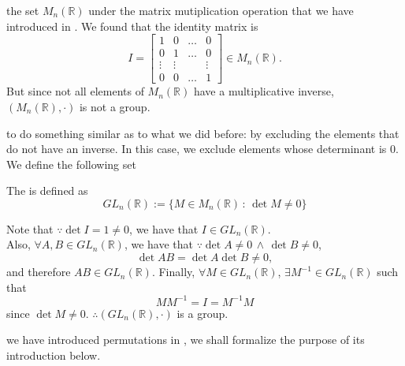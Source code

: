  the set $M_n(\mathbb{R})$ under the matrix mutiplication operation that we have introduced in . We found that the identity matrix is
\begin{equation*}
  I = \begin{bmatrix}
    1 & 0 & \hdots & 0 \\
    0 & 1 & \hdots & 0 \\
    \vdots & \vdots & & \vdots \\
    0 & 0 & \hdots & 1
  \end{bmatrix} \in M_n(\mathbb{R}).
\end{equation*}
But since not all elements of $M_n(\mathbb{R})$ have a multiplicative inverse, $(M_n(\mathbb{R}), \cdot)$ is not a group.

 to do something similar as to what we did before: by excluding the elements that do not have an inverse. In this case, we exclude elements whose determinant is $0$. We define the following set

\begin{defn}
\label{defn:general_linear_group}
  The  is defined as
  \begin{equation*}
    GL_n(\mathbb{R}) := \{ M \in M_n(\mathbb{R}) \, : \, \det M \neq 0 \}
  \end{equation*}
\end{defn}

Note that $\because \det I = 1 \neq 0$, we have that $I \in GL_n(\mathbb{R})$. \\
Also, $\forall A, B \in GL_n(\mathbb{R} )$, we have that $\because \det A \neq 0 \, \land \, \det B \neq 0$,
\begin{equation*}
  \det AB = \det A \det B \neq 0,
\end{equation*}
and therefore $AB \in GL_n(\mathbb{R} )$. Finally, $\forall M \in GL_n(\mathbb{R})$, $\exists M^{-1} \in GL_n(\mathbb{R})$ such that
\begin{equation*}
  MM^{-1} = I = M^{-1} M
\end{equation*}
since $\det M \neq 0$. $\therefore (GL_n(\mathbb{R}), \cdot)$ is a group.

 we have introduced permutations in , we shall formalize the purpose of its introduction below.

